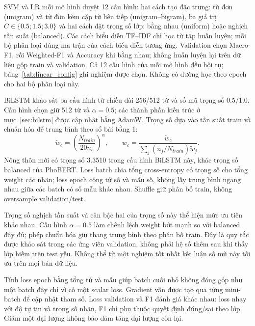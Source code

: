 SVM và LR mỗi mô hình duyệt 12 cấu hình: hai cách tạo đặc trưng: từ đơn (unigram) và từ đơn kèm cặp từ liên tiếp (unigram--bigram), ba giá trị $C\in\{0.5;1.5;3.0\}$ và hai cách đặt trọng số lớp: bằng nhau (uniform) hoặc nghịch tần suất (balanced). Các cách biểu diễn TF--IDF chỉ học từ tập huấn luyện; mỗi bộ phân loại dùng ma trận của cách biểu diễn tương ứng. Validation chọn Macro-F1, rồi Weighted-F1 và Accuracy khi bằng nhau; không huấn luyện lại trên dữ liệu gộp train và validation. Cả 12 cấu hình của mỗi mô hình đều hội tụ; bảng~\ref{tab:linear_config} ghi nghiệm được chọn. Không có đường học theo epoch cho hai bộ phân loại này.

BiLSTM khảo sát ba cấu hình từ chiều dài 256/512 từ và số mũ trọng số 0.5/1.0. Cấu hình chọn giữ 512 từ và $\alpha=0.5$; các thành phần kiến trúc ở mục~\ref{sec:bilstm} được cập nhật bằng AdamW. Trọng số dựa vào tần suất train và chuẩn hóa để trung bình theo số bài bằng 1:
\begin{equation}
\widetilde w_c=\left(\frac{N_{train}}{20n_c}\right)^{\alpha},\qquad
w_c=\frac{\widetilde w_c}{\sum_j(n_j/N_{train})\widetilde w_j}.
\end{equation}
Nông thôn mới có trọng số 3.3510 trong cấu hình BiLSTM này, khác trọng số balanced của PhoBERT. Loss batch chia tổng cross-entropy có trọng số cho tổng weight các nhãn; loss epoch cộng tử số và mẫu số, không lấy trung bình ngang nhau giữa các batch có số mẫu khác nhau. Shuffle giữ phân bố train, không oversample validation/test.


Trọng số nghịch tần suất và căn bậc hai của trọng số này thể hiện mức ưu tiên khác nhau. Cấu hình $\alpha=0.5$ làm chênh lệch weight bớt mạnh so với balanced đầy đủ; phép chuẩn hóa giữ thang trung bình theo phân bố train. Đây là quy tắc được khảo sát trong các ứng viên validation, không phải hệ số thêm sau khi thấy lớp hiếm trên test yếu. Không thể từ một nghiệm tốt nhất kết luận số mũ này tối ưu trên mọi bản dữ liệu.

Tính loss epoch bằng tổng tử và mẫu giúp batch cuối nhỏ không đóng góp như một batch đầy chỉ vì có một scalar loss. Gradient vẫn được tạo qua từng mini-batch để cập nhật tham số. Loss validation và F1 đánh giá khác nhau: loss nhạy với độ tự tin và trọng số nhãn, F1 chỉ phụ thuộc quyết định đúng/sai theo lớp. Giảm một đại lượng không bảo đảm tăng đại lượng còn lại.



